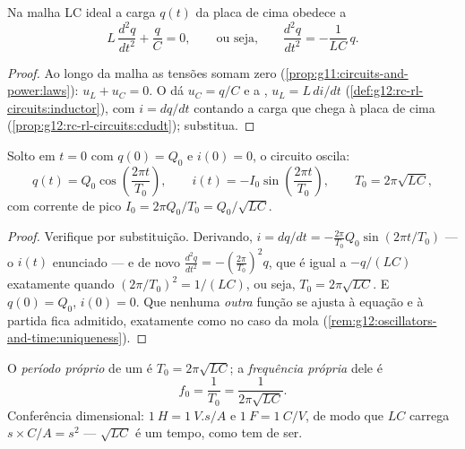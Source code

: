 \begin{proposition}[A equação do LC]\label{prop:g12:rlc-oscillations:equation}
Na malha LC ideal a carga $q(t)$ da placa de cima obedece a
\[
L\,\frac{d^2q}{dt^2} + \frac{q}{C} = 0,
\qquad\text{ou seja,}\qquad
\frac{d^2q}{dt^2} = -\frac{1}{LC}\,q .
\]
\end{proposition}

\begin{proof}
Ao longo da malha as tensões somam zero (\cref{prop:g11:circuits-and-power:laws}):
$u_L + u_C = 0$. O  dá $u_C = q/C$ e a , $u_L = L\,di/dt$
(\cref{def:g12:rc-rl-circuits:inductor}), com $i = dq/dt$ contando a carga que chega à
placa de cima (\cref{prop:g12:rc-rl-circuits:cdudt}); substitua.
\end{proof}

\begin{theorem}\label{thm:g12:rlc-oscillations:oscillation}
Solto em $t = 0$ com $q(0) = Q_0$ e $i(0) = 0$, o circuito oscila:
\[
q(t) = Q_0 \cos\!\left(\frac{2\pi t}{T_0}\right),
\qquad
i(t) = -I_0 \sin\!\left(\frac{2\pi t}{T_0}\right),
\qquad
T_0 = 2\pi\sqrt{LC},
\]
com corrente de pico $I_0 = 2\pi Q_0/T_0 = Q_0/\sqrt{LC}$.
\end{theorem}

\begin{proof}
Verifique por substituição. Derivando,
$i = dq/dt = -\frac{2\pi}{T_0} Q_0 \sin(2\pi t/T_0)$ --- o $i(t)$ enunciado --- e de
novo $\frac{d^2q}{dt^2} = -(\frac{2\pi}{T_0})^2 q$, que é igual a $-q/(LC)$ exatamente
quando $(2\pi/T_0)^2 = 1/(LC)$, ou seja, $T_0 = 2\pi\sqrt{LC}$. E $q(0) = Q_0$,
$i(0) = 0$. Que nenhuma \emph{outra} função se ajusta à equação e à partida fica
admitido, exatamente como no caso da mola
(\cref{rem:g12:oscillators-and-time:uniqueness}).
\end{proof}

\begin{definition}\label{def:g12:rlc-oscillations:period}
O \emph{período próprio} de um  é
$T_0 = 2\pi\sqrt{LC}$; a \emph{frequência própria} dele é
\[
f_0 = \frac{1}{T_0} = \frac{1}{2\pi\sqrt{LC}} .
\]
Conferência dimensional: $\qty{1}{H} = \qty{1}{V.s/A}$ e $\qty{1}{F} = \qty{1}{C/V}$,
de modo que $LC$ carrega $\unit{s} \times \unit{C/A} = \unit{s^2}$ --- $\sqrt{LC}$ é um
tempo, como tem de ser.
\end{definition}

